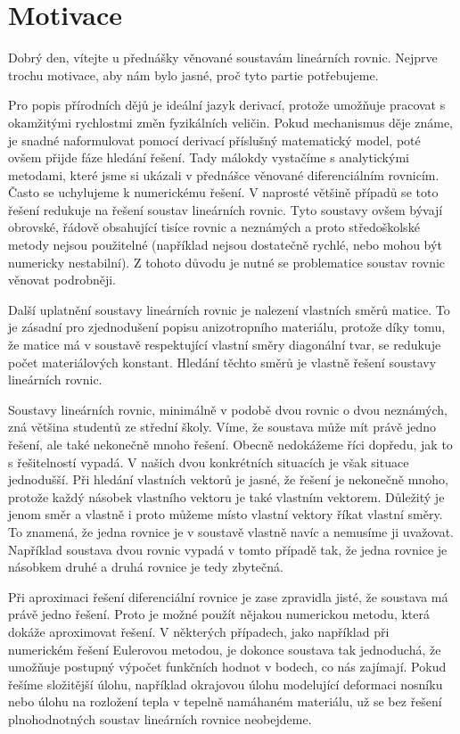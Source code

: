 \documentclass[12pt]{article}
\begin{document}
\section{Motivace}

Dobrý den, vítejte u přednášky věnované soustavám lineárních rovnic. Nejprve trochu motivace, aby nám bylo jasné, proč tyto partie potřebujeme. 

Pro popis přírodních dějů je ideální jazyk derivací, protože umožňuje pracovat s okamžitými rychlostmi změn fyzikálních veličin. Pokud mechanismus děje známe, je snadné naformulovat pomocí derivací příslušný matematický model, poté ovšem přijde fáze hledání řešení. Tady málokdy vystačíme s analytickými metodami, které jsme si ukázali v přednášce věnované diferenciálním rovnicím. Často se uchylujeme k numerickému řešení. V naprosté většině případů se toto řešení redukuje na řešení soustav lineárních rovnic. Tyto soustavy ovšem bývají obrovské, řádově obsahující tisíce rovnic a neznámých a proto středoškolské metody nejsou použitelné (například nejsou dostatečně rychlé, nebo mohou být numericky nestabilní). Z tohoto důvodu je nutné se problematice soustav rovnic věnovat podrobněji. 

Další uplatnění soustavy lineárních rovnic je nalezení vlastních směrů matice. To je zásadní pro zjednodušení popisu anizotropního materiálu, protože díky tomu, že matice má v soustavě respektující vlastní směry diagonální tvar, se redukuje počet materiálových konstant. Hledání těchto směrů je vlastně řešení soustavy lineárních rovnic. 

Soustavy lineárních rovnic, minimálně v podobě dvou rovnic o dvou neznámých, zná většina studentů ze střední školy. Víme, že soustava může mít právě jedno řešení, ale také nekonečně mnoho řešení. Obecně nedokážeme říci dopředu, jak to s řešitelností vypadá. V našich dvou konkrétních situacích je však situace jednodušší. Při hledání vlastních vektorů je jasné, že řešení je nekonečně mnoho, protože každý násobek vlastního vektoru je také vlastním vektorem. Důležitý je jenom směr a vlastně i proto můžeme místo vlastní vektory říkat vlastní směry. To znamená, že jedna rovnice je v soustavě vlastně navíc a nemusíme ji uvažovat. Například soustava dvou rovnic vypadá v tomto případě tak, že jedna rovnice je násobkem druhé a druhá rovnice je tedy zbytečná. 

Při aproximaci řešení diferenciální rovnice je zase zpravidla jisté, že soustava má právě jedno řešení. Proto je možné použít nějakou numerickou metodu, která dokáže aproximovat řešení. V některých případech, jako například při numerickém řešení Eulerovou metodou, je dokonce soustava tak jednoduchá, že umožňuje postupný výpočet funkčních hodnot v bodech, co nás zajímají. Pokud řešíme složitější úlohu, například okrajovou úlohu modelující deformaci nosníku nebo úlohu na rozložení tepla v tepelně namáhaném materiálu, už se bez řešení plnohodnotných soustav lineárních rovnice neobejdeme. 
 
\end{document}
